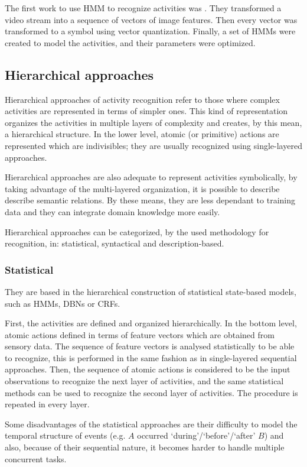The first work to use HMM to recognize activities was \citep{Yamato1992_RecHA_HMM}. They transformed a video stream into a sequence of vectors of image features. Then every vector was transformed to a symbol using vector quantization. Finally, a set of HMMs were created to model the activities, and their parameters were optimized. 


\subsection{Hierarchical approaches}
Hierarchical approaches of activity recognition refer to those where complex activities are represented in terms of simpler ones. 
This kind of representation organizes the activities in multiple layers of complexity and creates, by this mean, a hierarchical structure.
In the lower level, atomic (or primitive) actions are represented which are indivisibles; they are usually recognized using single-layered approaches.

Hierarchical approaches are also adequate to represent activities symbolically, by taking advantage of the multi-layered organization, it is possible to describe describe semantic relations.
By these means, they are less dependant to training data and they can integrate domain knowledge more easily.

Hierarchical approaches can be categorized, by the used methodology for recognition, in: statistical, syntactical and description-based. %


\subsubsection{Statistical}
They are based in the hierarchical construction of statistical state-based models, such as HMMs, DBNs or CRFs.

First, the activities are defined and organized hierarchically.
In the bottom level, atomic actions defined in terms of feature vectors which are obtained from sensory data.
The sequence of feature vectors is analysed statistically to be able to recognize, this is performed in the same fashion as in single-layered sequential approaches. 
Then, the sequence of atomic actions is considered to be the input observations to recognize the next layer of activities, and the same statistical methods can be used to recognize the second layer of activities.
The procedure is repeated in every layer.

Some disadvantages of the statistical approaches are their difficulty to model the temporal structure of events (e.g. $A$ occurred `during'/`before'/`after' $B$) and also, because of their sequential nature, it becomes harder to handle multiple concurrent tasks.

